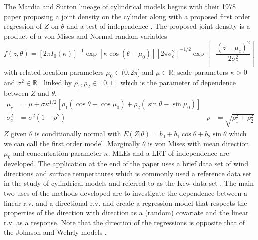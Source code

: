 The Mardia and Sutton lineage of cylindrical models begins with their 1978 paper proposing a joint density on the cylinder along with a proposed first order regression of $Z$ on $\theta$ and a test of independence \cite{mardia_model_1978}. The proposed joint density is a product of a von Mises and Normal random variables \[f(z,\theta) = [2\pi I_0(\kappa)]^{-1} \exp[\kappa \cos(\theta - \mu_0)][2\pi \sigma_c^2]^{-1/2} \exp\left[-\frac{(z - \mu_c)^2}{2\sigma_c^2}\right]\] with related location parameters $\mu_0 \in (0, 2\pi]$ and $\mu \in \mathbb{R}$, scale parameters $\kappa > 0$ and $\sigma^2 \in \mathbb{R^+}$ linked by $\rho_1, \rho_2 \in [0,1]$ which is the parameter of dependence between $Z$ and $\theta$. \begin{align*}
    \mu_c &= \mu + \sigma \kappa^{1/2} [\rho_1 (\cos\theta - \cos\mu_0) + \rho_2 (\sin\theta - \sin\mu_0)] \\
    \sigma_c^2 &= \sigma^2(1 - \rho^2) & \rho &= \sqrt{\rho_1^2 + \rho_2^2}
\end{align*} $Z$ given $\theta$ is conditionally normal with $E(Z | \theta) = b_0 + b_1 \cos\theta + b_2 \sin\theta$ which we can call the first order model. Marginally $\theta$ is von Mises with mean direction $\mu_0$ and concentration parameter $\kappa$. MLEs and a LRT of independence are developed. The application at the end of the paper uses a brief data set of wind directions and surface temperatures which is commonly used a reference data set in the study of cylindrical models and referred to as the Kew data set \cite{anderson-cook_second_2000}. The main two uses of the methods developed are to investigate the dependence between a linear r.v. and a directional r.v. and create a regression model that respects the properties of the direction with direction as a (random) covariate and the linear r.v. as a response. Note that the direction of the regressions is opposite that of the Johnson and Wehrly models \cite{johnson_angular-linear_1978} \cite{fisher_regression_1992}.

